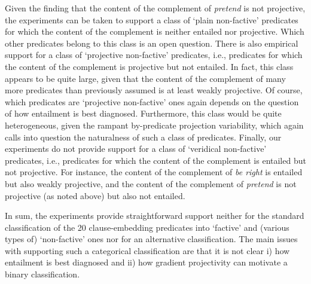 \documentclass[11pt,fleqn]{article}
\newcommand{\6}{\mbox{$[\hspace*{-.6mm}[$}}
\newcommand{\9}{\mbox{$]\hspace*{-.6mm}]$}}
\begin{document}
{Given the finding that the content of the complement of {\em pretend} is not projective, the experiments can be taken to support a class of `plain non-factive' predicates for which the content of the complement is neither entailed nor projective. Which other predicates belong to this class is an open question. There is also empirical support for a class of `projective non-factive' predicates, i.e., predicates for which the content of the complement is projective but not entailed. In fact, this class appears to be quite large, given that the content of the complement of many more predicates than previously assumed is at least weakly projective. Of course, which predicates are `projective non-factive' ones again depends on the question of how entailment is best diagnosed. Furthermore, this class would be quite heterogeneous, given the rampant by-predicate projection variability, which again calls into question the naturalness of such a class of predicates. Finally, our experiments do not provide support for a class of `veridical non-factive' predicates, i.e., predicates for which the content of the complement is entailed but not projective. For instance, the content of the complement of {\em be right} is entailed but also weakly projective, and the content of the complement of {\em pretend} is not projective (as noted above) but also not entailed. 

In sum, the experiments provide straightforward support neither for the standard classification of the 20 clause-embedding predicates into `factive' and (various types of) `non-factive' ones nor for an alternative classification. The main issues with supporting such a categorical classification are that it is not clear i) how entailment is best diagnosed and ii) how gradient projectivity can motivate a binary classification. 

}
\end{document}
